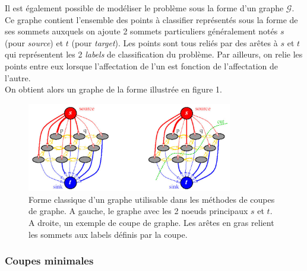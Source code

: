 \documentclass{article}
\begin{document}
Il est également possible de modéliser le problème sous la forme d'un graphe $\mathcal{G}$. Ce graphe contient l'ensemble des points à classifier représentés sous la forme de ses sommets auxquels on ajoute 2 sommets particuliers généralement notés $s$ (pour \textit{source}) et $t$ (pour \textit{target}). Les points sont tous reliés par des arêtes à $s$ et $t$ qui représentent les 2 \textit{labels} de classification du problème. Par ailleurs, on relie les points entre eux lorsque l'affectation de l'un est fonction de l'affectation de l'autre.\\
On obtient alors un graphe de la forme  illustrée en figure 1. 
\begin{figure}[!h]
	\begin{center}
		\includegraphics[width=0.8\textwidth]{Images/GC/graphcut.png} 
	\end{center}
	\caption{Forme classique d'un graphe utilisable dans les méthodes de coupes de graphe. A gauche, le graphe avec les 2 noeuds principaux $s$ et $t$. A droite, un exemple de coupe de graphe. Les arêtes en gras relient les sommets aux labels définis par la coupe.}
	\label{fig:GC_graphe}
\end{figure}

\subsubsection{Coupes minimales}
\end{document}
